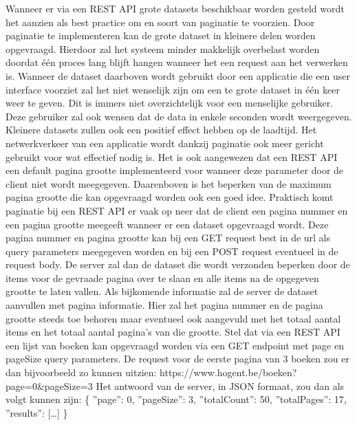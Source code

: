 Wanneer er via een REST API grote datasets beschikbaar worden gesteld wordt het aanzien als best practice om en soort van paginatie te voorzien. Door paginatie te
implementeren kan de grote dataset in kleinere delen worden opgevraagd. Hierdoor zal het systeem minder makkelijk overbelast worden doordat één proces lang blijft
hangen wanneer het een request aan het verwerken is. Wanneer de dataset daarboven wordt gebruikt door een applicatie die een user interface voorziet zal het
niet wenselijk zijn om een te grote dataset in één keer weer te geven. Dit is immers niet overzichtelijk voor een menselijke gebruiker.
Deze gebruiker zal ook wensen dat de data in enkele seconden wordt weergegeven. Kleinere datasets zullen ook een positief effect hebben op de laadtijd.
Het netwerkverkeer van een applicatie wordt dankzij paginatie ook meer gericht gebruikt voor wat effectief nodig is. Het is ook aangewezen dat een REST API een
default pagina grootte implementeerd voor wanneer deze parameter door de client niet wordt meegegeven. Daarenboven is het beperken van de maximum pagina grootte die
kan opgevraagd worden ook een goed idee.
Praktisch komt paginatie bij een REST API er vaak op neer dat de client een pagina nummer en een pagina grootte meegeeft wanneer er een dataset opgevraagd wordt.
Deze pagina nummer en pagina grootte kan bij een GET request best in de url als query parameters meegegeven worden en bij een POST request eventueel in de request body.
De server zal dan de dataset die wordt verzonden beperken door de items voor de gevraade pagina over te slaan en alle items na de opgegeven grootte te laten vallen.
Als bijkomende informatie zal de server de dataset aanvullen met pagina informatie. Hier zal het pagina nummer en de pagina grootte steeds toe behoren maar eventueel
ook aangevuld met het totaal aantal items en het totaal aantal pagina's van die grootte.
Stel dat via een REST API een lijst van boeken kan opgevraagd worden via een GET endpoint met page en pageSize query parameters. De request voor de eerste pagina
van 3 boeken zou er dan bijvoorbeeld zo kunnen uitzien:\newline
https://www.hogent.be/boeken?page=0\&pageSize=3
Het antwoord van de server, in JSON formaat, zou dan als volgt kunnen zijn:\newline
    \{
        ''page'': 0,
        ''pageSize'': 3,
        ''totalCount'': 50,
        ''totalPages'': 17,
        ''results'': [\ldots]
    \}\newline
~\autocite{paging}\\
~\autocite{wachtenLaadtijd}\\




